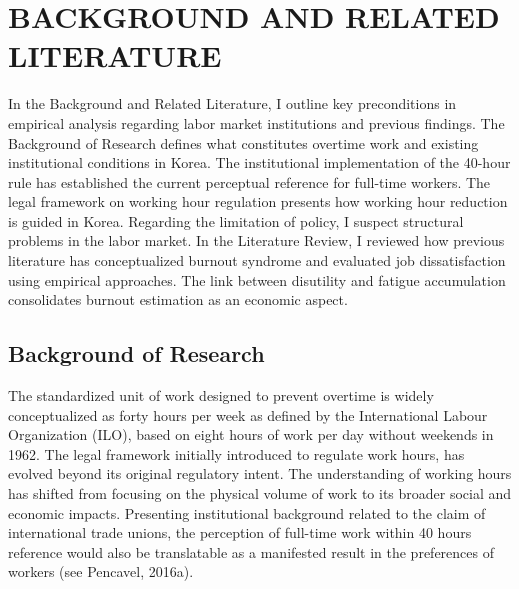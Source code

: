 \documentclass[
  12pt,
]{article}
\begin{document}
\newpage

\section{BACKGROUND AND RELATED
LITERATURE}\label{background-and-related-literature}

In the Background and Related Literature, I outline key preconditions in
empirical analysis regarding labor market institutions and previous
findings. The Background of Research defines what constitutes overtime
work and existing institutional conditions in Korea. The institutional
implementation of the 40-hour rule has established the current
perceptual reference for full-time workers. The legal framework on
working hour regulation presents how working hour reduction is guided in
Korea. Regarding the limitation of policy, I suspect structural problems
in the labor market. In the Literature Review, I reviewed how previous
literature has conceptualized burnout syndrome and evaluated job
dissatisfaction using empirical approaches. The link between disutility
and fatigue accumulation consolidates burnout estimation as an economic
aspect.

\subsection{Background of Research}\label{background-of-research}

The standardized unit of work designed to prevent overtime is widely
conceptualized as forty hours per week as defined by the International
Labour Organization (ILO), based on eight hours of work per day without
weekends in 1962. The legal framework initially introduced to regulate
work hours, has evolved beyond its original regulatory intent. The
understanding of working hours has shifted from focusing on the physical
volume of work to its broader social and economic impacts. Presenting
institutional background related to the claim of international trade
unions, the perception of full-time work within 40 hours reference would
also be translatable as a manifested result in the preferences of
workers (see Pencavel, 2016a).
\end{document}
